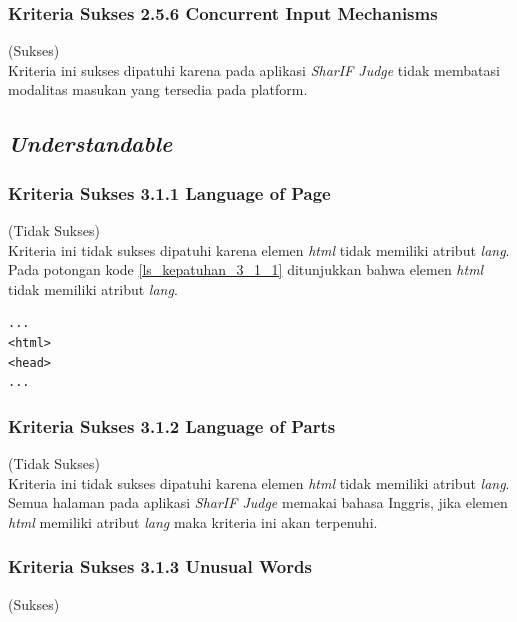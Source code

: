 \documentclass[a4paper,twoside]{article}
\begin{document}
\begin{enumerate}
		\subsubsection*{Kriteria Sukses 2.5.6 Concurrent Input Mechanisms}
		\label{subsubsec:kepatuhan_kriteria_2.5.6}
		(Sukses) \\
		
		Kriteria ini sukses dipatuhi karena pada aplikasi \textit{SharIF Judge} tidak membatasi modalitas masukan yang tersedia pada platform.
		
		\subsection*{\textit{Understandable}}
		\label{subsec:kepatuhan_understandable}
		
		\subsubsection*{Kriteria Sukses 3.1.1 Language of Page}
		\label{subsubsec:kepatuhan_kriteria_3.1.1}
		(Tidak Sukses) \\
		
		Kriteria ini tidak sukses dipatuhi karena elemen \textit{html} tidak memiliki atribut \textit{lang}. Pada potongan kode \ref{ls_kepatuhan_3_1_1} ditunjukkan bahwa elemen \textit{html} tidak memiliki atribut \textit{lang}.
		\begin{lstlisting}[basicstyle=\ttfamily, frame=single,
		columns=fullflexible, keepspaces=true, breaklines=true, label=ls_kepatuhan_3_1_1, caption=Kriteria Sukses 3.1.1 - Elemen \textit{HTML}]
...
<html>
<head>
...
		\end{lstlisting}
		
		\subsubsection*{Kriteria Sukses 3.1.2 Language of Parts}
		\label{subsubsec:kepatuhan_kriteria_3.1.2}
		(Tidak Sukses) \\
		
		Kriteria ini tidak sukses dipatuhi karena elemen \textit{html} tidak memiliki atribut \textit{lang}. Semua halaman pada aplikasi \textit{SharIF Judge} memakai bahasa Inggris, jika elemen \textit{html} memiliki atribut \textit{lang} maka kriteria ini akan terpenuhi.
		
		\subsubsection*{Kriteria Sukses 3.1.3 Unusual Words}
		\label{subsubsec:kepatuhan_kriteria_3.1.3}
		(Sukses) \\
		

\end{enumerate}
\end{document}
